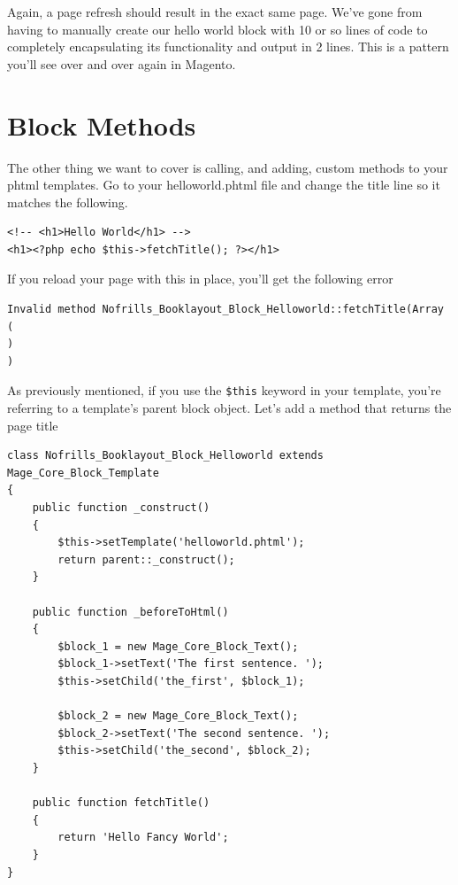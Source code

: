 \documentclass[oneside]{book}
\begin{document}
Again, a page refresh should result in the exact same page.  We've gone from having to manually create our hello world block with 10 or so lines of code to completely encapsulating its functionality and output in 2 lines. This is a pattern you'll see over and over again in Magento.

\section{Block Methods}

The other thing we want to cover is calling, and adding, custom methods to your phtml templates.   Go to your helloworld.phtml file and change the title line so it matches the following.

\begin{lstlisting}
<!-- <h1>Hello World</h1> -->
<h1><?php echo $this->fetchTitle(); ?></h1>

\end{lstlisting}


If you reload your page with this in place, you'll get the following error

\begin{lstlisting}
Invalid method Nofrills_Booklayout_Block_Helloworld::fetchTitle(Array
(
)
)

\end{lstlisting}


As previously mentioned, if you use the \footnotesize\texttt{\$this} \normalsize  keyword in your template, you're referring to a template's parent block object.  Let's add a method that returns the page title

\begin{lstlisting}
class Nofrills_Booklayout_Block_Helloworld extends Mage_Core_Block_Template
{
    public function _construct()
    {
        $this->setTemplate('helloworld.phtml');
        return parent::_construct();
    }

    public function _beforeToHtml()
    {
        $block_1 = new Mage_Core_Block_Text();
        $block_1->setText('The first sentence. ');
        $this->setChild('the_first', $block_1);

        $block_2 = new Mage_Core_Block_Text();
        $block_2->setText('The second sentence. ');
        $this->setChild('the_second', $block_2);
    }

    public function fetchTitle()
    {
        return 'Hello Fancy World';
    }
}

\end{lstlisting}
\end{document}
